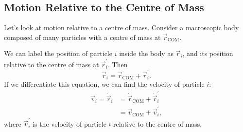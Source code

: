 \documentclass[../classical_mechanics.tex]{subfiles}
\begin{document}
        \subsection{Motion Relative to the Centre of Mass}\label{subsec:motion-relative-to-the-centre-of-mass}
            Let's look at motion relative to a centre of mass.
            Consider a macroscopic body composed of many particles with a centre of mass at $\vec{r}_\text{COM}$.
            \begin{figure}[H]
                \centering
            \end{figure}
            We can label the position of particle $i$ inside the body as $\vec{r}_i$, and its position relative to the centre of mass at $\vec{r}_i^\prime$.
            Then
            \begin{equation}
                \vec{r}_i=\vec{r}_\text{COM}+\vec{r}_i^\prime.
            \end{equation}
            If we differentiate this equation, we can find the velocity of particle $i$:
            \begin{align}
                \vec{v}_i=\dot{\vec{r}}_i&=\dot{\vec{r}}_\text{COM}+\dot{\vec{r}}_i^\prime\\
                &=\vec{v}_\text{COM}+\vec{v}_i^\prime,
            \end{align}
            where $\vec{v}_i^\prime$ is the velocity of particle $i$ relative to the centre of mass.
\end{document}
